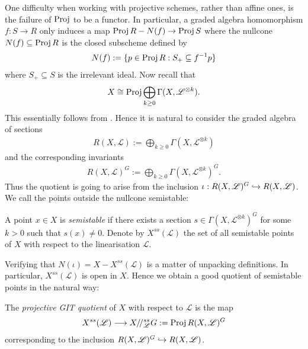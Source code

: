 \documentclass[12pt]{ociamthesis}  %
\begin{document}
One difficulty when working with projective schemes, rather
than affine ones, is the failure of $\operatorname{Proj}$ to be a functor. In particular,
a graded algebra homomorphism $f : S \to R$ only induces a map
$\operatorname{Proj} R - N(f) \to \operatorname{Proj} S$ where the nullcone $N(f)\subseteq\operatorname{Proj} R$ is the closed
subscheme defined by \missingcitation
\begin{align*}
  N(f) := \{ p \in \operatorname{Proj} R : S_+ \subseteq f^{-1}p\}
\end{align*}
where $S_+\subseteq S$ is the irrelevant ideal.
Now recall that
\begin{align*}
  X \cong \operatorname{Proj}\bigoplus_{k\geq 0}\Gamma(X,\mathscr L^{\otimes k}).
\end{align*}
This essentially follows from \cite[Proposition 13.48]{gortz2010}. Hence
it is natural to consider the graded algebra of sections
\begin{align*}
  R(X,\mathscr L) := \bigoplus_{k\geq 0}\Gamma(X,\mathscr L^{\otimes k})
\end{align*}
and the corresponding invariants
\begin{align*}
  R(X,\mathscr L)^G := \bigoplus_{k\geq 0}\Gamma(X,\mathscr L^{\otimes k})^G.
\end{align*}
Thus the quotient is going to arise from the inclusion
$\iota : R(X,\mathscr L)^G\hookrightarrow R(X,\mathscr L)$. We call the points outside the nullcone
semistable:

\begin{definition}
  A point $x\in X$ is \emph{semistable} if there exists a section
  $s\in\Gamma(X,\mathscr L^{\otimes k})^G$ for some $k>0$ such that $s(x)\neq 0$.
  Denote by $X^{ss}(\mathscr L)$ the set of all semistable points of $X$
  with respect to the linearisation $\mathscr L$.
\end{definition}

Verifying that $N(\iota) = X - X^{ss}(\mathscr L)$ is a matter of unpacking definitions.
In particular, $X^{ss}(\mathscr L)$ is open in $X$. Hence we obtain a good quotient
of semistable points in the natural way:

\begin{definition}
  The \emph{projective GIT quotient} of $X$ with respect to $\mathscr L$ is the map
  \begin{align*}
    X^{ss}(\mathscr L) \longrightarrow X /\!/^{ss}_{\mathscr L} G := \operatorname{Proj} R(X,{\mathscr L})^G
  \end{align*}
  corresponding to the inclusion $R(X,{\mathscr L})^G\hookrightarrow R(X,{\mathscr L})$.
\end{definition}
\end{document}
